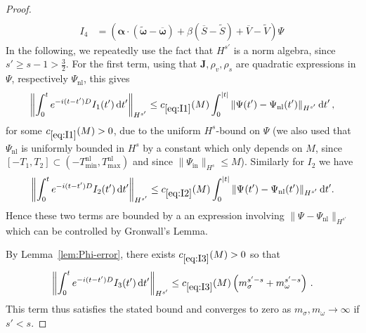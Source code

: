 \documentclass[AHL,Unicode,longabstracts,published]{cedram}
\newcommand{\rmin}{\mathrm{in}}
\newcommand{\nl}{\mathrm{nl}}
\renewcommand\d[1]{{\ensuremath{\,\text{d}#1}}}
\begin{document}
\begin{proof}
\begin{align}
\\
I_4&=\left(\bm\alpha\cdot (\widetilde{\bm \omega}-\overline{{\bm \omega}})+\beta(\overline{S}-\widetilde{S})+\overline{V}-\widetilde{V}\right)\Psi\,
\end{align}
In the following, we repeatedly use the fact that $H^{s'}$ is a norm algebra, since $s'\geq s-1>\tfrac32$. For the first term, using that ${\bm J}, \rho_v, \rho_s$ are quadratic expressions in $\Psi$, respectively $\Psi_\nl$, this gives
\begin{equation}\label{eq:I1}
\left\|\int_0^te^{-i(t-t')D}I_1(t')\d t'\right\|_{H^{s'}}\leq c_{\eqref{eq:I1}}(M)\int_0^{|t|}\|\Psi(t')-\Psi_{\nl}(t')\|_{H^{s'}}\d t'\,,
\end{equation}
for some $c_{\eqref{eq:I1}}(M)>0$, due to the uniform $H^{s}$-bound on $\Psi$ (we also used that $\Psi_{\nl}$ is uniformly bounded in $H^s$ by a constant which only depends on $M$, since $[-T_1,T_2]\subset(-T_{\min}^{\nl},T_{\max}^{\nl})$ and since $\|\Psi_{\rmin}\|_{H^s}\leq M$). Similarly for $I_2$ we have
\begin{equation}\label{eq:I2}
\left\|\int_0^te^{-i(t-t')D}I_2(t')\d t'\right\|_{H^{s'}} \leq c_{\eqref{eq:I2}}(M) \int_0^{|t|} \|\Psi_{}(t')-\Psi_{\nl}(t')\|_{H^{s'}} \d t'.
\end{equation}
Hence these two terms are bounded by a an expression involving $\|\Psi_{}-\Psi_{\nl}\|_{H^{s'}}$ which can be controlled by Gronwall's Lemma.

By Lemma~\ref{lem:Phi-error}, there exists $c_{\eqref{eq:I3}}(M)>0$ so that
\begin{equation}\label{eq:I3}
\left\|\int_0^te^{-i(t-t')D}I_3(t')\d t'\right\|_{H^{s'}}\leq c_{\eqref{eq:I3}}(M)\left(m_\sigma^{s'-s}+m_{\omega}^{s'-s}\right)\,.
\end{equation}
This term thus satisfies the stated bound and converges to zero as $m_\sigma, m_\omega\to \infty$ if $s'<s$.


\end{proof}
\end{document}

